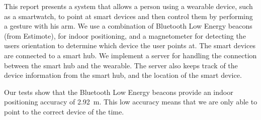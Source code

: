 This report presents a system that allows a person using a wearable device, such as a smartwatch, to point at smart devices and then control them by performing a gesture with his arm. We use a combination of Bluetooth Low Energy beacons (from Estimote), for indoor positioning, and a magnetometer for detecting the users orientation to determine which device the user points at. The smart devices are connected to a smart hub. We implement a server for handling the connection between the smart hub and the wearable. The server also keeps track of the device information from the smart hub, and the location of the smart device.

Our tests show that the Bluetooth Low Energy beacons provide an indoor positioning accuracy of \SI{2.92}{\meter}. This low accuracy means that we are only able to point to the correct device  of the time. 